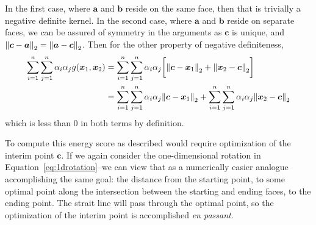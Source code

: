 In the first case, where $\bm{a}$ and $\bm{b}$ reside on the same face, then that is trivially a
  negative definite kernel.  In the second case, where $\bm{a}$ and $\bm{b}$ reside on separate
  faces, we can be assured of symmetry in the arguments as $\bm{c}$ is unique, and $\pnorm{\bm{c} - \bm{a}}{2} = \pnorm{\bm{a} - \bm{c}}{2}$.  Then for the other property of negative definiteness,
  \begin{equation*}
    \begin{aligned}
      \sum_{i = 1}^n\sum_{j = 1}^n \alpha_i\alpha_j g(\bm{x}_1,\bm{x}_2) &= \sum_{i = 1}^n\sum_{j = 1}^n \alpha_i\alpha_j \bigg[\pnorm{\bm{c} - \bm{x}_1}{2} + \pnorm{\bm{x}_2 - \bm{c}}{2}\bigg]\\
      &= \sum_{i = 1}^n\sum_{j = 1}^n \alpha_i\alpha_j\pnorm{\bm{c} - \bm{x}_1}{2} + \sum_{i = 1}^n\sum_{j = 1}^n \alpha_i\alpha_j\pnorm{\bm{x}_2 - \bm{c}}{2}
    \end{aligned}
  \end{equation*}
  which is less than $0$ in both terms by definition.

To compute this energy score as described would require optimization of the interim point $\bm{c}$.
  If we again consider the one-dimensional rotation in Equation~\ref{eq:1drotation}--we
  can view that as a numerically easier analogue accomplishing the same goal: the distance from
  the starting point, to some optimal point along the intersection between the starting and
  ending faces, to the ending point.  The strait line will pass through the optimal point, so
  the optimization of the interim point is accomplished \emph{en passant}.


